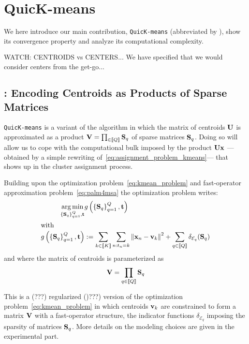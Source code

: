
\section{QuicK-means}
\label{sec:contribution}

We here introduce our main contribution, \texttt{QuicK-means} (abbreviated by \qkmeans), 
show its convergence property and analyze its computational complexity.

WATCH: CENTROIDS vs CENTERS... We have specified that we would consider
centers from the get-go...

\subsection{\qkmeans: Encoding Centroids as Products of Sparse Matrices}

\texttt{QuicK-means} is a variant of the \kmeans algorithm in which the matrix of centroids ${\mathbf{U}}$
is approximated as a product ${\mathbf{V}}=\prod_{\in\left \llbracket Q\right \rrbracket}{\mathbf{S}}_q$ of sparse matrices ${\mathbf{S}}_q$.
Doing so will allow us to cope with the computational bulk imposed by the product ${\mathbf{U}}{\mathbf{x}}$
---obtained by a simple rewriting of~\eqref{eq:assignment_problem_kmeans}--- that shows up in the cluster assignment 
process.

Building upon the \kmeans optimization problem~\eqref{eq:kmean_problem} and fast-operator approximation problem~\eqref{eq:palm4msa} the \qkmeans optimization problem 
writes:
%
\begin{align}
\label{eq:qmean_problem}
 \operatorname*{arg\,min}_{\left\{{\mathbf{S}}_q\right\}_{q=1}^{Q}, {\mathbf{t}}} & g\left(\left\{{\mathbf{S}}_q\right\}_{q=1}^{Q}, {\mathbf{t}}\right)\\
 \intertext{with}
  g\left(\left\{{\mathbf{S}}_q\right\}_{q=1}^{Q}, {\mathbf{t}}\right)&:=  \sum_{k\in\left \llbracket K\right \rrbracket}\sum_{n: t_n = k} \left\|{\mathbf{x}}_n -{\mathbf{v}}_k\right\|^2 + \sum_{q\in\left \llbracket Q\right \rrbracket} \delta_{\mathcal{E}_q}({\mathbf{S}}_q)\label{eq:objective}
\end{align}
and where the matrix of centroids is parameterized as
\begin{equation}
	\label{eq:centroids}
	{\mathbf{V}} = \prod_{q\in\left \llbracket Q\right \rrbracket}{\mathbf{S}}_q
\end{equation}

%
This is a (???) regularized ()???)  version of the \kmeans optimization problem~\eqref{eq:kmean_problem} in which centroids ${\mathbf{v}}_k$ are constrained to form a matrix ${\mathbf{V}}$ with a fast-operator structure, the indicator functions $\delta_{\mathcal{E}_q}$ imposing the sparsity of matrices ${\mathbf{S}}_q$.
More details on the modeling choices are given in the experimental part. %

